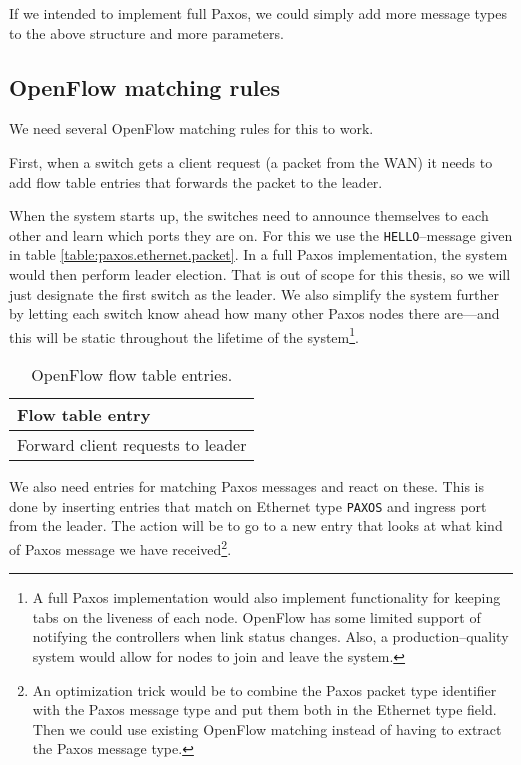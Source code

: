 If we intended to implement full Paxos, we could simply add more message
types to the above structure and more parameters.

\subsection{OpenFlow matching rules}

We need several OpenFlow matching rules for this to work.

First, when a switch gets a client request (a packet from the WAN) it needs
to add flow table entries that forwards the packet to the leader.

When the system starts up, the switches need to announce themselves to each
other and learn which ports they are on.  For this we use the
\texttt{HELLO}--message given in table \ref{table:paxos.ethernet.packet}.
In a full Paxos implementation, the system would then perform leader
election.  That is out of scope for this thesis, so we will just designate
the first switch as the leader.  We also simplify the system further by
letting each switch know ahead how many other Paxos nodes there are---and
this will be static throughout the lifetime of the system\footnote{A full
Paxos implementation would also implement functionality for keeping tabs
on the liveness of each node.  OpenFlow has some limited support of
notifying the controllers when link status changes.  Also, a
production--quality system would allow for nodes to join and leave the
system.}.

\begin{table}[H]
  \centering
  \begin{tabular}{|l|}
    \hline \textbf{Flow table entry} \\
    \hline Forward client requests to leader \\
    \hline
  \end{tabular}

  \caption{OpenFlow flow table entries.}
  \label{table:paxos.flowtable.entries}
\end{table}

We also need entries for matching Paxos messages and react on these.
This is done by inserting entries that match on Ethernet type
\texttt{PAXOS} and ingress port from the leader.
The action will be to go to a new entry that looks at what kind of Paxos
message we have received\footnote{An optimization trick would be to
combine the Paxos packet type identifier with the Paxos message type and put
them both in the Ethernet type field.  Then we could use existing OpenFlow
matching instead of having to extract the Paxos message type.}.

